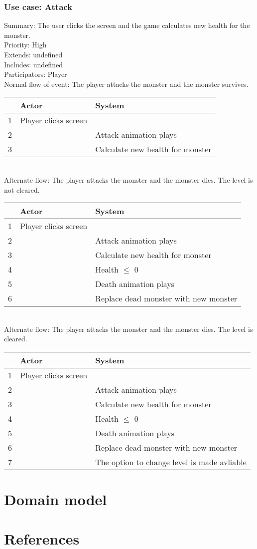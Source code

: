 \documentclass{article}
\begin{document}
\subsubsection{Use case: Attack}
Summary: The user clicks the screen and the game calculates new health for the monster.\\
Priority: High\\
Extends: undefined\\
Includes: undefined\\
Participators: Player\\
Normal flow of event: The player attacks the monster and the monster survives.
\begin{tabular}{| c | l | l |} \hline
    & Actor & System \\ \hline
    1 & Player clicks screen & \\ \hline
    2 & & Attack animation plays \\ \hline
    3 & & Calculate new health for monster\\ \hline
\end{tabular}\\
Alternate flow: The player attacks the monster and the monster dies. The level is not cleared.\\
\begin{tabular}{| c | l | l |} \hline
    & Actor & System \\ \hline
    1 & Player clicks screen & \\ \hline
    2 & & Attack animation plays \\ \hline
    3 & & Calculate new health for monster\\ \hline
    4 & & Health $\le$ 0 \\ \hline
    5 & & Death animation plays \\ \hline 
    6 & & Replace dead monster with new monster \\ \hline
\end{tabular}\\
Alternate flow: The player attacks the monster and the monster dies. The level is cleared.\\
\begin{tabular}{| c | l | l |} \hline
    & Actor & System \\ \hline
    1 & Player clicks screen & \\ \hline
    2 & & Attack animation plays \\ \hline
    3 & & Calculate new health for monster\\ \hline
    4 & & Health $\le$ 0 \\ \hline
    5 & & Death animation plays \\ \hline 
    6 & & Replace dead monster with new monster \\ \hline
    7 & & The option to change level is made avliable\\ \hline
\end{tabular}

\section{Domain model}

\section{References}
\end{document}
